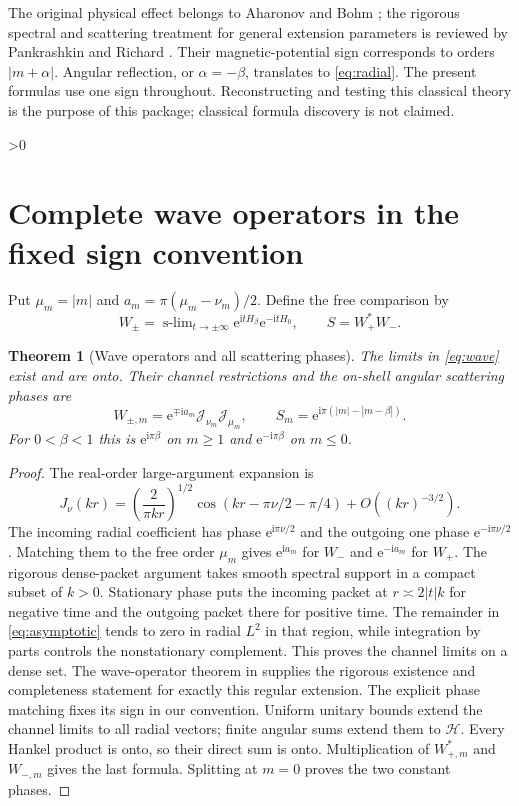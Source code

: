 \documentclass[10pt]{article}
\newcommand{\e}{\mathrm e}
\newcommand{\ii}{\mathrm i}
\newcommand{\HH}{\mathcal H}
\newcommand{\JJ}{\mathcal J}
\newtheorem{theorem}{Theorem}
\begin{document}
The original physical effect belongs to Aharonov and Bohm \cite{AB}; the
rigorous spectral and scattering treatment for general extension parameters
is reviewed by Pankrashkin and Richard \cite{PR}. Their magnetic-potential
sign corresponds to orders $|m+\alpha|$. Angular reflection, or
$\alpha=-\beta$, translates to \eqref{eq:radial}. The present formulas use
one sign throughout. Reconstructing and testing this classical theory is the
purpose of this package; classical formula discovery is not claimed.

\ifnum\CRevisionRound>0
\newpage
\section{Complete wave operators in the fixed sign convention}
Put $\mu_m=|m|$ and $a_m=\pi(\mu_m-\nu_m)/2$. Define the free comparison by
\begin{equation}
W_\pm=\operatorname{s-lim}_{t\to\pm\infty}\e^{\ii tH_\beta}\e^{-\ii tH_0},
\qquad S=W_+^*W_-.
\label{eq:wave}
\end{equation}
\begin{theorem}[Wave operators and all scattering phases]
The limits in \eqref{eq:wave} exist and are onto. Their channel restrictions
and the on-shell angular scattering phases are
\begin{equation}
W_{\pm,m}=\e^{\mp\ii a_m}\JJ_{\nu_m}\JJ_{\mu_m},\qquad
S_m=\e^{\ii\pi(|m|-|m-\beta|)}.
\label{eq:phases}
\end{equation}
For $0<\beta<1$ this is $\e^{\ii\pi\beta}$ on $m\ge1$ and
$\e^{-\ii\pi\beta}$ on $m\le0$.
\end{theorem}
\begin{proof}
The real-order large-argument expansion is
\begin{equation}
J_\nu(kr)=\left(\frac2{\pi kr}\right)^{1/2}
\cos(kr-\pi\nu/2-\pi/4)+O((kr)^{-3/2}).
\label{eq:asymptotic}
\end{equation}
The incoming radial coefficient has phase $\e^{\ii\pi\nu/2}$ and the
outgoing one phase $\e^{-\ii\pi\nu/2}$. Matching them to the free order
$\mu_m$ gives $\e^{\ii a_m}$ for $W_-$ and $\e^{-\ii a_m}$ for $W_+$.
The rigorous dense-packet argument takes smooth spectral support in a compact
subset of $k>0$. Stationary phase puts the incoming packet at $r\asymp2|t|k$
for negative time and the outgoing packet there for positive time. The
remainder in \eqref{eq:asymptotic} tends to zero in radial $L^2$ in that
region, while integration by parts controls the nonstationary complement.
This proves the channel limits on a dense set. The wave-operator theorem in
\cite[Lemma 7 and the original AB channel calculation]{PR} supplies the
rigorous existence and completeness statement for exactly this regular
extension. The explicit phase matching fixes its sign in our convention.
Uniform unitary bounds extend the channel limits to all radial vectors;
finite angular sums extend them to $\HH$. Every Hankel product is onto, so
their direct sum is onto. Multiplication of $W_{+,m}^*$ and $W_{-,m}$ gives
the last formula. Splitting at $m=0$ proves the two constant phases.
\end{proof}
\end{document}

